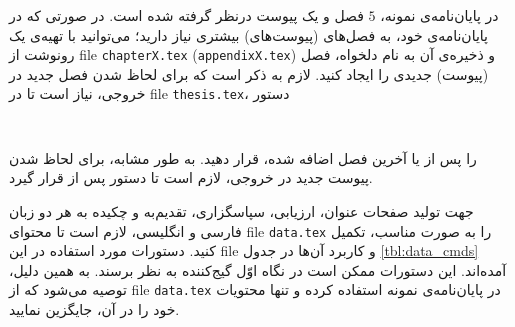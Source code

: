 در پایان‌نامه‌ی نمونه، $5$ فصل و یک پیوست درنظر گرفته شده است. در صورتی که در پایان‌نامه‌ی خود، به فصل‌های (پیوست‌های) بیشتری نیاز دارید؛ می‌توانید با تهیه‌ی یک رونوشت از \gls{file} \texttt{chapterX.tex} (\texttt{appendixX.tex}) و ذخیره‌ی آن به نام دلخواه، فصل (پیوست) جدیدی را ایجاد کنید. لازم به ذکر است که برای لحاظ شدن فصل جدید در خروجی، نیاز است تا در \gls{file} \texttt{thesis.tex}، دستور
\begin{latin}
	\begin{verbatim}
	
	\end{verbatim}
\end{latin}
را پس از {\verb||} یا آخرین فصل اضافه شده، قرار دهید. به طور مشابه، برای لحاظ شدن پیوست جدید در خروجی، لازم است تا دستور \verb|| پس از \verb|| قرار گیرد. 

	جهت تولید صفحات عنوان، ارزیابی، سپاسگزاری، تقدیم‌به و چکیده به هر دو زبان فارسی و انگلیسی، لازم است تا محتوای \gls{file} \texttt{data.tex} را به صورت مناسب، تکمیل کنید. دستورات مورد استفاده در این \gls{file} و کاربرد آن‌ها در جدول \ref{tbl:data_cmds} آمده‌اند. این دستورات ممکن است در نگاه اوّل گیج‌کننده به نظر برسند. به همین دلیل، توصیه می‌شود که از \gls{file} \verb|data.tex| در پایان‌نامه‌ی نمونه استفاده کرده و تنها محتویات خود را در آن، جایگزین نمایید. 
	
